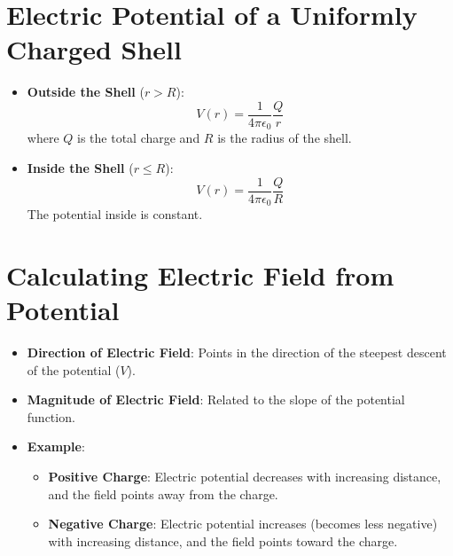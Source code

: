 \documentclass{article}
\begin{document}
\section*{Electric Potential of a Uniformly Charged Shell}
\begin{itemize}
    \item \textbf{Outside the Shell} (\(r > R\)):
    \[
    V(r) = \frac{1}{4 \pi \epsilon_0} \frac{Q}{r}
    \]
    where \(Q\) is the total charge and \(R\) is the radius of the shell.
    \item \textbf{Inside the Shell} (\(r \leq R\)):
    \[
    V(r) = \frac{1}{4 \pi \epsilon_0} \frac{Q}{R}
    \]
    The potential inside is constant.
\end{itemize}

\section*{Calculating Electric Field from Potential}
\begin{itemize}
    \item \textbf{Direction of Electric Field}: Points in the direction of the steepest descent of the potential (\(V\)).
    \item \textbf{Magnitude of Electric Field}: Related to the slope of the potential function.
    \item \textbf{Example}:
    \begin{itemize}
        \item \textbf{Positive Charge}: Electric potential decreases with increasing distance, and the field points away from the charge.
        \item \textbf{Negative Charge}: Electric potential increases (becomes less negative) with increasing distance, and the field points toward the charge.
    \end{itemize}
\end{itemize}
\end{document}
